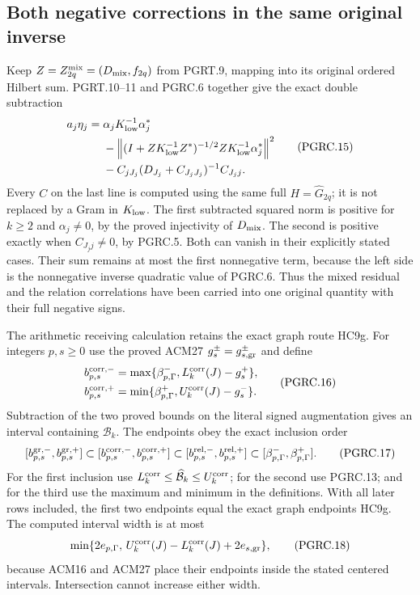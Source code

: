 \subsection{Both negative corrections in the same original inverse}

Keep $Z=Z_{2q}^{\rm mix}=(D_{\rm mix},f_{2q})$ from PGRT.9,
mapping into its original ordered Hilbert sum. PGRT.10--11 and
PGRC.6 together give the exact double subtraction
\[
 \begin{aligned}
 a_j\eta_j={}&\alpha_jK_{\rm low}^{-1}\alpha_j^*\\
 &-\left\|(I+ZK_{\rm low}^{-1}Z^*)^{-1/2}
                      ZK_{\rm low}^{-1}\alpha_j^*\right\|^2\\
 &-C_{jJ_j}(D_{J_j}+C_{J_jJ_j})^{-1}C_{J_jj}.
 \end{aligned}
 \tag{PGRC.15}\label{GraphV2:eq:pgrc-double-subtraction}
\]
Every $C$ on the last line is computed using the same full
$H=\widehat G_{2q}$; it is not replaced by a Gram in
$K_{\rm low}$. The first subtracted squared norm is positive
for $k\geq2$ and $\alpha_j\ne0$, by the proved injectivity of
$D_{\rm mix}$. The second is positive exactly when
$C_{J_jj}\ne0$, by PGRC.5. Both can vanish in their explicitly
stated cases. Their sum remains at most the first nonnegative term,
because the left side is the nonnegative inverse quadratic value
of PGRC.6. Thus the mixed residual and the relation correlations
have been carried into one original quantity with their full
negative signs.

The arithmetic receiving calculation retains the exact graph
route HC9g. For integers $p,s\geq0$ use the proved ACM27
$g_s^\pm=g_{s,\rm gr}^\pm$ and define
\[
 \begin{aligned}
 b_{p,s}^{\rm corr,-}
 &=\max\{\beta_{p,\Gamma}^-,L_k^{\rm corr}(J)-g_s^+\},\\
 b_{p,s}^{\rm corr,+}
 &=\min\{\beta_{p,\Gamma}^+,U_k^{\rm corr}(J)-g_s^-\}.
 \end{aligned}
 \tag{PGRC.16}\label{GraphV2:eq:pgrc-arithmetic-return}
\]
Subtraction of the two proved bounds on the literal signed
augmentation gives an interval containing $\mathcal B_k$.
The endpoints obey the exact inclusion order
\[
 [b_{p,s}^{\rm gr,-},b_{p,s}^{\rm gr,+}]
 \subset [b_{p,s}^{\rm corr,-},b_{p,s}^{\rm corr,+}]
 \subset [b_{p,s}^{\rm rel,-},b_{p,s}^{\rm rel,+}]
 \subset [\beta_{p,\Gamma}^-,\beta_{p,\Gamma}^+].
 \tag{PGRC.17}\label{GraphV2:eq:pgrc-nesting}
\]
For the first inclusion use
$L_k^{\rm corr}\leq\widehat{\mathcal B}_k\leq U_k^{\rm corr}$;
for the second use PGRC.13; and for the third use the maximum
and minimum in the definitions. With all later rows included,
the first two endpoints equal the exact graph endpoints HC9g.
The computed interval width is at most
\[
 \min\{2e_{p,\Gamma},\,
       U_k^{\rm corr}(J)-L_k^{\rm corr}(J)+2e_{s,\rm gr}\},
 \tag{PGRC.18}\label{GraphV2:eq:pgrc-arithmetic-width}
\]
because ACM16 and ACM27 place their endpoints inside the stated
centered intervals. Intersection cannot increase either width.

